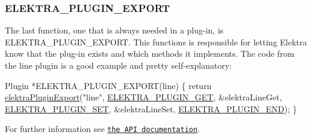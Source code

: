 \subsubsection*{{\ttfamily E\+L\+E\+K\+T\+R\+A\+\_\+\+P\+L\+U\+G\+I\+N\+\_\+\+E\+X\+P\+O\+RT}}

The last function, one that is always needed in a plug-\/in, is {\ttfamily E\+L\+E\+K\+T\+R\+A\+\_\+\+P\+L\+U\+G\+I\+N\+\_\+\+E\+X\+P\+O\+RT}. This functions is responsible for letting Elektra know that the plug-\/in exists and which methods it implements. The code from the line plugin is a good example and pretty self-\/explanatory\+:


\begin{DoxyCode}
Plugin *ELEKTRA\_PLUGIN\_EXPORT(line)
\{
        \textcolor{keywordflow}{return} \hyperlink{group__plugin_ga8dd092048e972a3f0c9c9f54eb41576e}{elektraPluginExport}(\textcolor{stringliteral}{"line"},
        \hyperlink{kdbplugin_8h_afed89ef026fb0622918a5de020de7814a3d5f4a887e68878f1cc3a75985194204}{ELEKTRA\_PLUGIN\_GET}, &elektraLineGet,
        \hyperlink{kdbplugin_8h_afed89ef026fb0622918a5de020de7814a85c9545261cf0bcc932616e67ea3b70a}{ELEKTRA\_PLUGIN\_SET}, &elektraLineSet,
        \hyperlink{kdbplugin_8h_afed89ef026fb0622918a5de020de7814a64a0bc789482284d9fd27ce974e0959a}{ELEKTRA\_PLUGIN\_END});
\}
\end{DoxyCode}


For further information see \href{https://doc.libelektra.org/api/current/html/group__plugin.html}{\tt the A\+PI documentation}. 